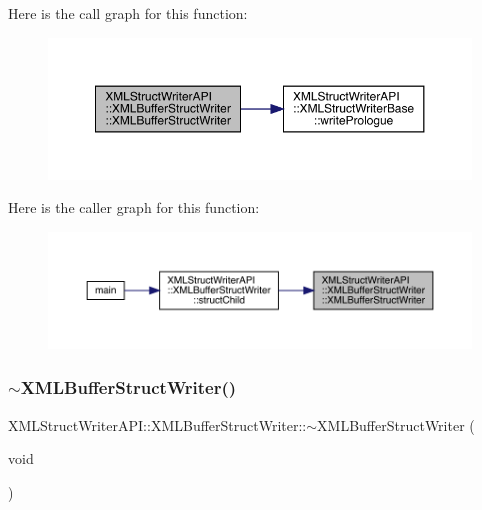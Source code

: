 Here is the call graph for this function\+:
\nopagebreak
\begin{figure}[H]
\begin{center}
\leavevmode
\includegraphics[width=350pt]{d2/d0a/classXMLStructWriterAPI_1_1XMLBufferStructWriter_adc348003ff0e12b5a820972cbc51a376_cgraph}
\end{center}
\end{figure}
Here is the caller graph for this function\+:
\nopagebreak
\begin{figure}[H]
\begin{center}
\leavevmode
\includegraphics[width=350pt]{d2/d0a/classXMLStructWriterAPI_1_1XMLBufferStructWriter_adc348003ff0e12b5a820972cbc51a376_icgraph}
\end{center}
\end{figure}
\mbox{\label{classXMLStructWriterAPI_1_1XMLBufferStructWriter_a00bf336d98d848ad4552ee46ea32dd78}} 
\subsubsection{\texorpdfstring{$\sim$XMLBufferStructWriter()}{~XMLBufferStructWriter()}\hspace{0.1cm}{\footnotesize\ttfamily [1/3]}}
{\footnotesize\ttfamily X\+M\+L\+Struct\+Writer\+A\+P\+I\+::\+X\+M\+L\+Buffer\+Struct\+Writer\+::$\sim$\+X\+M\+L\+Buffer\+Struct\+Writer (\begin{DoxyParamCaption}\item[{void}]{ }\end{DoxyParamCaption})\hspace{0.3cm}{\ttfamily [inline]}}

